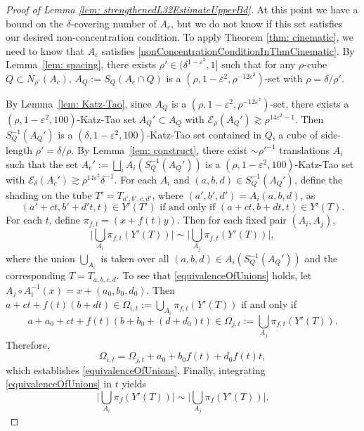 \documentclass[letterpaper, reqno,11pt]{article}
\numberwithin{equation}{section}
\newcommand{\cP}{A}
\newcommand{\cE}{\mathcal{E}}
\newcommand{\eps}{\varepsilon}
\numberwithin{thm}{section}
\theoremstyle{remark}
\begin{document}
\begin{proof}[Proof of Lemma \ref{lem: strengthenedL32EstimateUpperBd}]
At this point we have a bound on the $\delta$-covering number of $\cP_c$, but we do not know if this set satisfies our desired non-concentration condition. To apply Theorem \ref{thm: cinematic}, we need to know that $\cP_c$ satisfies \eqref{nonConcentrationConditionInThmCinematic}. By Lemma~\ref{lem: spacing}, there exists $ \rho' \in (\delta^{1-\eps^2}, 1]$ such that for any $\rho$-cube $Q\subset N_{\rho'}(\cP_c)$, 
$\cP_{Q}:= S_Q(\cP_c\cap Q)$ is a $(\rho, 1-\eps^2, \rho^{-12\eps^2})$-set with $\rho=\delta/\rho'$. 

By Lemma~\ref{lem: Katz-Tao}, since $\cP_Q$ is a $(\rho, 1-\eps^2, \rho^{-12\eps^2})$-set,  there exists 
a  $(\rho, 1-\eps^2, 100)$-Katz-Tao set $\cP_Q'\subset \cP_Q$ with $\cE_{\rho}(\cP_Q') \gtrsim \rho^{14\eps^2-1}.$  Then $S_Q^{-1} (\cP_Q')$ is a  $(\delta, 1-\eps^2, 100)$-Katz-Tao set contained  in $Q$, a cube of side-length $\rho'=\delta/\rho$. By Lemma~\ref{lem: construct}, there
exist $\sim \rho'^{-1}$ translations $A_i$ such that the set $\cP_c':= \bigsqcup_{i} A_i (S_Q^{-1}(\cP_Q'))$ is a  $(\rho, 1-\eps^2, 100)$-Katz-Tao set with $\cE_{\delta}(\cP_c')\gtrsim  \rho^{14\eps^2} \delta^{-1}.$ For each $A_i$ and $(a,b,d)\in S_Q^{-1}(\cP_Q')$, define the  shading on the tube $T'=T_{a',b',c,d'}$, where $(a',b',d')=A_i(a,b,d)$, as
\[ (a'+ct, b'+d't,t)\in Y'(T') \text{ if and only if  } (a+ct, b+dt, t)\in Y'(T).\]  
For each $t$, define 
$\pi_{f,t}= (x+f(t)y)$. Then for each fixed pair $(A_i, A_j)$, 
\begin{equation}\label{equivalenceOfUnions}
\Big|\bigcup_{A_i} \pi_{f,t} (Y'(T)) \Big|\sim \Big|\bigcup_{A_j} \pi_{f,t}(Y'(T))\Big|,
\end{equation}
where the union $\bigcup_{A_i}$ is taken over all $(a,b,d)\in A_i(S_Q^{-1}(\cP_Q'))$ and the corresponding $T=T_{a,b,c,d}$.  To see that \eqref{equivalenceOfUnions} holds, let $A_j\circ A_i^{-1}(x)= x+ (a_0,b_0, d_0)$. 
Then $a+ct+ f(t)(b+dt)\in \Omega_{i,t}:= \bigcup_{A_i} \pi_{f,t}(Y'(T))$ if and only if  \[ a+a_0 + ct+  f(t)( b+b_0 + (d+d_0)t)\in \Omega_{j,t}:=\bigcup_{A_j}\pi_{f,t}(Y'(T)).\]
 Therefore, \[
 \Omega_{i,t}= \Omega_{j,t}+ a_0 +b_0f(t) + d_0f(t)t,\]
which establishes \eqref{equivalenceOfUnions}. Finally, integrating \eqref{equivalenceOfUnions} in $t$ yields
 \begin{equation}\label{eq: translate}
 \Big|\bigcup_{A_i} \pi_f (Y'(T))\Big| \sim \Big|\bigcup_{A_j} \pi_{f} (Y'(T))\Big|.
 \end{equation}



\end{proof}
\end{document}
